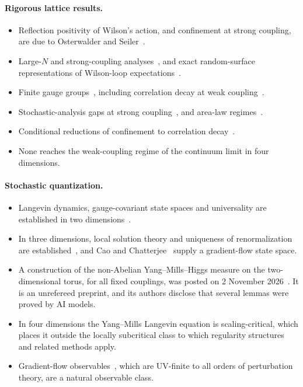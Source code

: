 \documentclass[11pt]{article}
\theoremstyle{definition}
\theoremstyle{remark}
\begin{document}
\paragraph{Rigorous lattice results.}
\begin{itemize}[leftmargin=*]
\item Reflection positivity of Wilson's action, and confinement at strong coupling, are due to
  Osterwalder and Seiler~\cite{Osterwalder1978,Seiler1982}.
\item Large-$N$ and strong-coupling analyses~\cite{Chatterjee2019,Basu2018,Jafarov2016}, and exact
  random-surface representations of Wilson-loop expectations~\cite{Cao2025c}.
\item Finite gauge groups~\cite{Cao2020,Chatterjee2020,Forsstrom2022b}, including correlation
  decay at weak coupling~\cite{Adhikari2025}.
\item Stochastic-analysis gaps at strong coupling~\cite{Shen2023}, and area-law
  regimes~\cite{Cao2025a,Cao2025b}.
\item Conditional reductions of confinement to correlation decay~\cite{Durhuus1980,Chatterjee2021}.
\item None reaches the weak-coupling regime of the continuum limit in four dimensions.
\end{itemize}

\paragraph{Stochastic quantization.}
\begin{itemize}[leftmargin=*]
\item Langevin dynamics, gauge-covariant state spaces and universality are established in two
  dimensions~\cite{Chandra2022,Chevyrev2019,Chevyrev2026b}.
\item In three dimensions, local solution theory and uniqueness of renormalization are
  established~\cite{Chandra2024b,Chevyrev2026d}, and Cao and Chatterjee~\cite{Cao2023,Cao2024a}
  supply a gradient-flow state space.
\item A construction of the non-Abelian Yang--Mills--Higgs measure on the two-dimensional torus,
  for all fixed couplings, was posted on 2 November 2026~\cite{Bringmann2026b}. It is an
  unrefereed preprint, and its authors disclose that several lemmas were proved by AI models.
\item In four dimensions the Yang--Mills Langevin equation is scaling-critical, which places it
  outside the locally subcritical class to which regularity structures~\cite{Hairer2014} and
  related methods apply.
\item Gradient-flow observables~\cite{Luscher2010a,Luscher2011}, which are UV-finite to all
  orders of perturbation theory, are a natural observable class.
\end{itemize}
\end{document}

